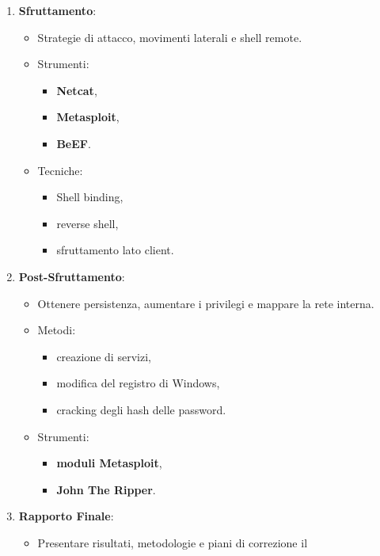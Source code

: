 \documentclass[12pt]{article}
\begin{document}
\begin{enumerate}
\begin{enumerate}
        \item \textbf{Sfruttamento}:
        \begin{itemize}
            \item Strategie di attacco, movimenti laterali e shell remote.
            \item Strumenti: 
            \begin{itemize}
                \item \textbf{Netcat},
                \item \textbf{Metasploit},
                \item \textbf{BeEF}.
            \end{itemize}
            \item Tecniche: 
            \begin{itemize}
                \item Shell binding,
                \item reverse shell,
                \item sfruttamento lato client.
            \end{itemize}
        \end{itemize}
        \item \textbf{Post-Sfruttamento}:
        \begin{itemize}
            \item Ottenere persistenza, aumentare i privilegi e mappare la rete 
            interna.
            \item Metodi:
            \begin{itemize}
                \item creazione di servizi,
                \item modifica del registro di Windows,
                \item cracking degli hash delle password.
            \end{itemize} 
            \item Strumenti: 
            \begin{itemize}
                \item \textbf{moduli Metasploit},
                \item \textbf{John The Ripper}.
            \end{itemize}
        \end{itemize}
        \item \textbf{Rapporto Finale}:
        \begin{itemize}
            \item Presentare risultati, metodologie e piani di correzione il 

\end{itemize}
\end{enumerate}
\end{enumerate}
\end{document}
